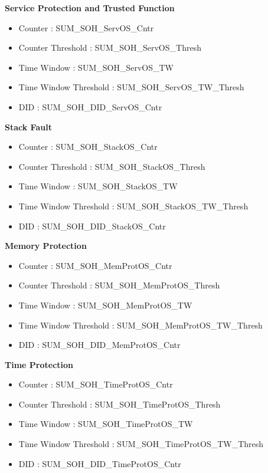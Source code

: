 \textbf{Service Protection and Trusted Function}
\begin{itemize}
    \item Counter               : SUM_SOH_ServOS_Cntr
    \item Counter Threshold     : SUM_SOH_ServOS_Thresh
    \item Time Window           : SUM_SOH_ServOS_TW 
    \item Time Window Threshold : SUM_SOH_ServOS_TW_Thresh 
    \item DID                   : SUM_SOH_DID_ServOS_Cntr
\end{itemize}

\textbf{Stack Fault}
\begin{itemize}
    \item Counter               : SUM_SOH_StackOS_Cntr
    \item Counter Threshold     : SUM_SOH_StackOS_Thresh
    \item Time Window           : SUM_SOH_StackOS_TW 
    \item Time Window Threshold : SUM_SOH_StackOS_TW_Thresh 
    \item DID                   : SUM_SOH_DID_StackOS_Cntr
\end{itemize}

\textbf{Memory Protection}
\begin{itemize}
    \item Counter               : SUM_SOH_MemProtOS_Cntr
    \item Counter Threshold     : SUM_SOH_MemProtOS_Thresh
    \item Time Window           : SUM_SOH_MemProtOS_TW 
    \item Time Window Threshold : SUM_SOH_MemProtOS_TW_Thresh 
    \item DID                   : SUM_SOH_DID_MemProtOS_Cntr
\end{itemize}

\textbf{Time Protection}
\begin{itemize}
    \item Counter               : SUM_SOH_TimeProtOS_Cntr
    \item Counter Threshold     : SUM_SOH_TimeProtOS_Thresh
    \item Time Window           : SUM_SOH_TimeProtOS_TW 
    \item Time Window Threshold : SUM_SOH_TimeProtOS_TW_Thresh 
    \item DID                   : SUM_SOH_DID_TimeProtOS_Cntr
\end{itemize}

